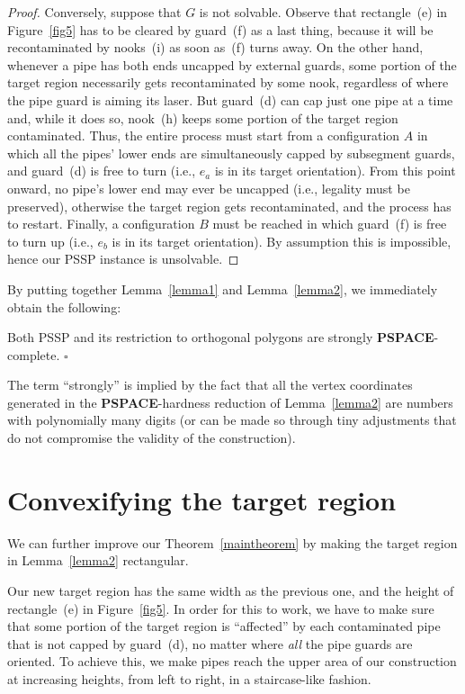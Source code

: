 \documentclass{style}
\newcommand{\complexityclass}[1]{\textbf{#1}}
\newcommand{\computproblem}[1]{\textsc{#1}}
\newcommand{\PSPACE}{\complexityclass{PSPACE}\xspace}
\newcommand{\PSSP}{\computproblem{PSSP}\xspace}
\begin{document}
\begin{proof}
Conversely, suppose that $G$ is not solvable. Observe that rectangle~(e) in Figure~\ref{fig5} has to be cleared by guard~(f) as a last thing, because it will be recontaminated by nooks~(i) as soon as~(f) turns away. On the other hand, whenever a pipe has both ends uncapped by external guards, some portion of the target region necessarily gets recontaminated by some nook, regardless of where the pipe guard is aiming its laser. But guard~(d) can cap just one pipe at a time and, while it does so, nook~(h) keeps some portion of the target region contaminated. Thus, the entire process must start from a configuration $A$ in which all the pipes' lower ends are simultaneously capped by subsegment guards, and guard~(d) is free to turn (i.e., $e_a$ is in its target orientation). From this point onward, no pipe's lower end may ever be uncapped (i.e., legality must be preserved), otherwise the target region gets recontaminated, and the process has to restart. Finally, a configuration $B$ must be reached in which guard~(f) is free to turn up (i.e., $e_b$ is in its target orientation). By assumption this is impossible, hence our \PSSP instance is unsolvable.
\end{proof}

By putting together Lemma~\ref{lemma1} and Lemma~\ref{lemma2}, we immediately obtain the following:

\begin{theorem} \label{maintheorem}
Both \PSSP and its restriction to orthogonal polygons are strongly \PSPACE-complete. \hfill $\square$
\end{theorem}

The term ``strongly'' is implied by the fact that all the vertex coordinates generated in the \PSPACE-hardness reduction of Lemma~\ref{lemma2} are numbers with polynomially many digits (or can be made so through tiny adjustments that do not compromise the validity of the construction).

\section{Convexifying the target region} \label{convexregion}

We can further improve our Theorem~\ref{maintheorem} by making the target region in Lemma~\ref{lemma2} rectangular.

Our new target region has the same width as the previous one, and the height of rectangle~(e) in Figure~\ref{fig5}. In order for this to work, we have to make sure that some portion of the target region is ``affected'' by each contaminated pipe that is not capped by guard~(d), no matter where \emph{all} the pipe guards are oriented. To achieve this, we make pipes reach the upper area of our construction at increasing heights, from left to right, in a staircase-like fashion.
\end{document}
